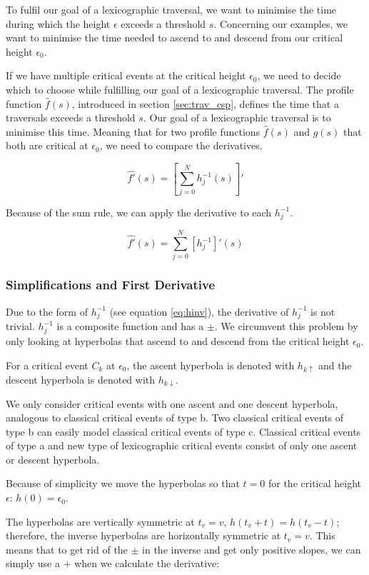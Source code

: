 To fulfil our goal of a lexicographic traversal, we want to minimise the time during which the height $\epsilon$ exceeds a threshold $s$.\cite{rotelex} Concerning our examples, we want to minimise the time needed to ascend to and descend from our critical height $\epsilon_0$.

If we have multiple critical events at the critical height $\epsilon_0$, we need to decide which to choose while fulfilling our goal of a lexicographic traversal. The profile function $\hat{f}(s)$, introduced in section \ref{sec:trav_csp}, defines the time that a traversals exceeds a threshold $s$. Our goal of a lexicographic traversal is to minimise this time. Meaning that for two profile functions $\hat{f}(s)$ and $\hat{g}(s)$ that both are critical at $\epsilon_0$, we need to compare the derivatives.

$$\hat{f'}(s) = \left[ \sum_{j=0}^N {h_j^{-1}(s)} \right]'$$

Because of the sum rule, we can apply the derivative to each $h_j^{-1}$.

$$\hat{f'}(s) = \sum_{j=0}^N {[h_j^{-1}]'(s)}$$


\subsubsection{Simplifications and First Derivative}\label{sec:first_derivative}

Due to the form of $h_j^{-1}$ (see equation \ref{eq:hinv}), the derivative of $h_j^{-1}$ is not trivial. $h_j^{-1}$ is a composite function and has a $\pm$. We circumvent this problem by only looking at hyperbolas that ascend to and descend from the critical height $\epsilon_0$.

For a critical event $C_k$ at $\epsilon_0$, the ascent hyperbola is denoted with $h_{k\uparrow}$ and the descent hyperbola is denoted with $h_{k\downarrow}$.

We only consider critical events with one ascent and one descent hyperbola, analogous to classical critical events of type b. Two classical critical events of type b can easily model classical critical events of type c. Classical critical events of type a and new type of lexicographic critical events consist of only one ascent or descent hyperbola.

Because of simplicity we move the hyperbolas so that $t = 0$ for the critical height $\epsilon$: $h(0) = \epsilon_0$.

The hyperbolas are vertically symmetric at $t_v=v$, $h(t_v+t) = h(t_v-t)$; therefore, the inverse hyperbolas are horizontally symmetric at $t_v = v$. This means that to get rid of the $\pm$ in the inverse and get only positive slopes, we can simply use a $+$ when we calculate the derivative:

